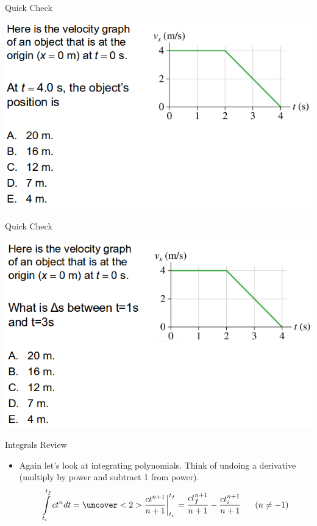 \documentclass{beamer}
\newcommand{\red}[1]{{\color{red}{#1}}}
\newcommand{\checkL}[2]{\begin{textblock*}{1cm}(#1,#2){\Large \red{\Checkmark}}\end{textblock*}}
\begin{document}
\begin{frame}{Quick Check}
\begin{center}
   \includegraphics[width=\textwidth]{../figures/QC2_9.png}
\end{center}
\only<2->{\checkL{0.8cm}{6.3cm}}
\end{frame}

\begin{frame}{Quick Check}
\begin{center}
   \includegraphics[width=\textwidth]{../figures/QC2_9_2.png}
\end{center}
\only<2->{\checkL{0.8cm}{6.8cm}}
\end{frame}

\begin{frame}{Integrals Review}
\begin{itemize}
   \item Again let's look at integrating polynomials. Think of undoing a derivative (multiply by power and subtract 1 from power).
   \begin{equation*}
      \int\limits_{t_i}^{t_f} ct^ndt = \uncover<2>{\frac{ct^{n+1}}{n+1}\bigg|_{t_i}^{t_f} = \frac{ct_f^{n+1}}{n+1} - \frac{ct_i^{n+1}}{n+1} ~~~~~ (n \ne -1)}
   \end{equation*}
\end{itemize}
\end{frame}
\end{document}
